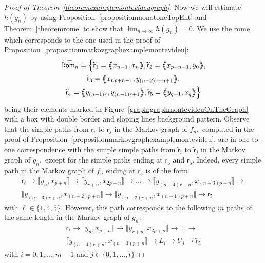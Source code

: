 \documentclass[a4paper, 11pt]{amsart}
\numberwithin{equation}{section}
\theoremstyle{customnumberedtheorem}
\theoremstyle{definitionwithbfnote}
\newcommand{\BIclass}[1]{\ensuremath{\llbracket #1\rrbracket}}
\newcommand{\BIgraph}[1]{\ensuremath{\mathopen{\bigl\langle\mkern-7.8mu\bigl\langle\mspace{-6.5mu}\bigl\langle} #1 \mathclose{\bigr\rangle\mspace{-6.5mu}\bigr\rangle\mkern-7.8mu\bigr\rangle}}}
\begin{document}
\begin{proof}[Proof of Theorem~\ref{theoremexamplemontevideugraph}]
Now we will estimate $h(g_n)$ by using
Proposition~\ref{propositionmonotoneTopEnt} and
Theorem~\ref{theoremrome} to show that
$\lim_{n\to\infty} h(g_n) = 0.$
We use the rome which corresponds to the one used in the proof of
Proposition~\ref{propositionmarkovgraphexamplemontevideu}:
\begin{multline*}
\widetilde{\textsf{Rom}}_n = \Bigl\{\widetilde{\textsf{r}}_1 = \BIgraph{x_{n-1},x_n},
                   \widetilde{\textsf{r}}_2 = \BIgraph{x_{p+n-1},y_0},\\
                   \widetilde{\textsf{r}}_3 = \BIgraph{x_{np+n-1},y_{(n-2)r +n+1}}, \\
                   \widetilde{\textsf{r}}_4 = \BIgraph{y_{(n-1)r},y_{(n-1)r +1}},
                   \widetilde{\textsf{r}}_5 = \BIgraph{y_{q-1},x_q}\Bigr\}
\end{multline*}
being their elements marked in
Figure~\ref{graph:graphmontevideuOnTheGraph} with a box
with double border and sloping lines background pattern.
Observe that the simple paths from
$\textsf{r}_i$ to $\textsf{r}_j$ in the Markov graph of $f_n,$
computed in the proof of
Proposition~\ref{propositionmarkovgraphexamplemontevideu},
are in one-to-one correspondence with the simple simple paths from
$\widetilde{\textsf{r}}_i$ to $\widetilde{\textsf{r}}_j$
in the Markov graph of $g_n,$ except for the simple paths ending at
$\textsf{r}_5$ and $\widetilde{\textsf{r}}_5.$
Indeed, every simple path in the Markov graph of $f_n$ ending at
$\textsf{r}_5$ is of the form
\begin{multline*}
\textsf{r}_{\ell} \longrightarrow \BIclass{y_n,x_{p+n}} \longrightarrow
\BIclass{y_{r+n},x_{2p+n}} \longrightarrow \dots \longrightarrow
\BIclass{y_{(n-4)r+n}, x_{(n-3)p+n}} \longrightarrow \\
\BIclass{y_{(n-3)r+n}, x_{(n-2)p+n}} \longrightarrow
\BIclass{y_{(n-2)r+n}, x_{(n-1)p+n}} \longrightarrow \textsf{r}_5
\end{multline*}
with $\ell \in \{1,4,5\}.$
However, this path corresponds to the following $m$
paths of the same length in the Markov graph of $g_n$:
\begin{multline*}
\widetilde{\textsf{r}}_{\ell} \longrightarrow \BIclass{y_n,x_{p+n}} \longrightarrow
\BIclass{y_{r+n},x_{2p+n}} \longrightarrow \dots \longrightarrow \\
\BIclass{y_{(n-4)r+n}, x_{(n-3)p+n}} \longrightarrow
L_i \longrightarrow U_j \longrightarrow \widetilde{\textsf{r}}_5
\end{multline*}
with $i = 0,1,\dots, m-1$ and $j \in \{0,1,\dots,t\}$

\end{proof}
\end{document}
